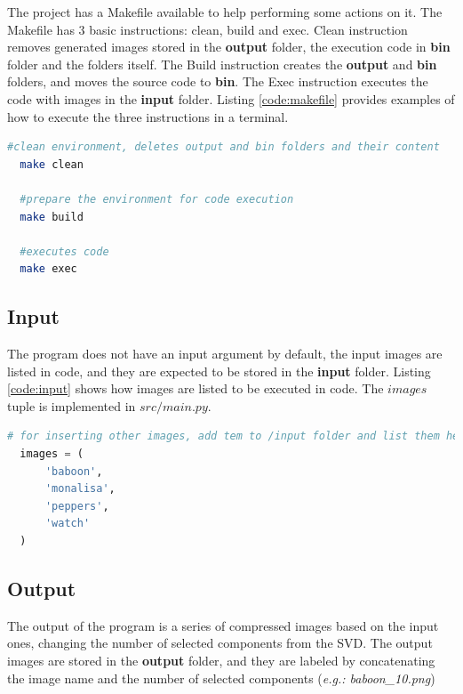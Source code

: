 \documentclass[]{IEEEtran}
\begin{document}
The project has a Makefile available to help performing some actions on it. The Makefile has 3 basic instructions: clean, build and exec. Clean instruction removes generated images stored in the \textbf{output} folder, the execution code in \textbf{bin} folder and the folders itself. The Build instruction creates the \textbf{output} and \textbf{bin} folders, and moves the source code to \textbf{bin}. The Exec instruction executes the code with images in the \textbf{input} folder. Listing \ref{code:makefile} provides examples of how to execute the three instructions in a terminal.
\begin{lstlisting}[language=sh, caption={Makefile usage example}, label={code:makefile}]
  #clean environment, deletes output and bin folders and their content
  make clean
  
  #prepare the environment for code execution
  make build 

  #executes code
  make exec
\end{lstlisting}

\subsection{Input}

The program does not have an input argument by default, the input images are listed in code, and they are expected to be stored in the \textbf{input} folder. Listing \ref{code:input} shows how images are listed to be executed in code. The $images$ tuple is implemented in $src/main.py$.

\begin{lstlisting}[language=Python, caption={Input images inside code}, label={code:input}]
  # for inserting other images, add tem to /input folder and list them here
  images = (
      'baboon',
      'monalisa',
      'peppers',
      'watch'
  )
\end{lstlisting}

\subsection{Output}
The output of the program is a series of compressed images based on the input ones, changing the number of selected components from the SVD. The output images are stored in the \textbf{output} folder, and they are labeled by concatenating the image name and the number of selected components (\textit{e.g.: baboon\_10.png})
\end{document}
